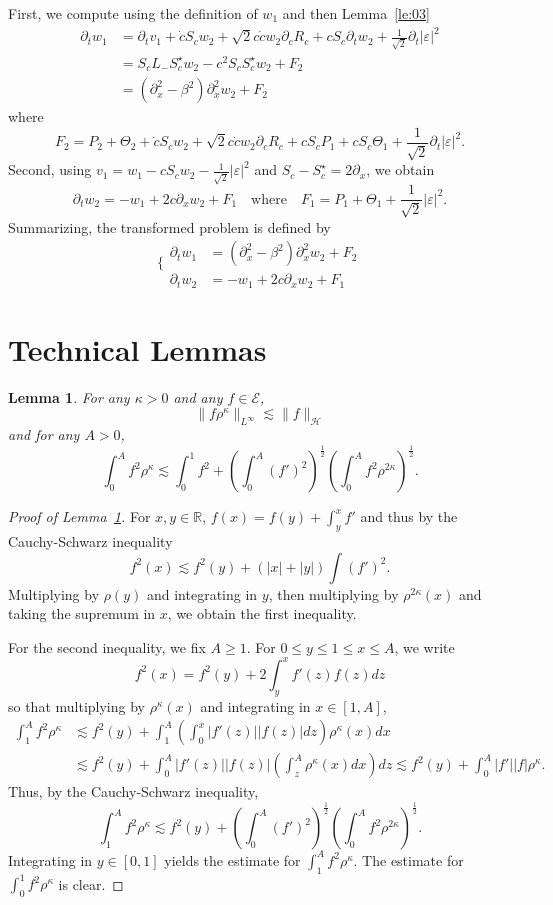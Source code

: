 \documentclass[11pt]{amsart}
\newtheorem{lemma}{Lemma}
\theoremstyle{remark}
\newcommand\RR{\mathbb{R}}
\newcommand\cE{\mathcal{E}}
\newcommand\cH{\mathcal{H}}
\newcommand\ep{\varepsilon}
\begin{document}
First, we compute using the definition of $w_1$ and then Lemma~\ref{le:03}
\begin{align*}
\partial_t w_1 &=\partial_t v_1+\dot c S_c w_2+\sqrt{2} c \dot c w_2\partial_c R_c +c S_c \partial_t w_2+\frac 1{\sqrt{2}} \partial_t |\ep|^2\\
&=S_cL_-S_c^\star w_2 - c^2 S_c S_c^\star w_2+F_2\\
&= (\partial_{x}^2-\beta^2 )\partial_{x}^2 w_2+F_2
\end{align*}
where 
\[
F_2=P_2+\Theta_2+\dot c S_c w_2+\sqrt{2} c\dot c w_2\partial_c R_c
+c S_c P_1+cS_c\Theta_1+\frac 1{\sqrt{2}} \partial_t |\ep|^2.
\]
Second, using $v_1=w_1-c S_c w_2-\frac 1{\sqrt{2}}|\ep|^2$ and $S_c-S_c^\star=2\partial_x$,
we obtain 
\[
\partial_t w_2=-w_1+2 c\partial_x w_2 + F_1\quad\mbox{where}\quad
F_1=P_1+\Theta_1+\frac 1{\sqrt{2}} |\ep|^2.
\]
Summarizing, the transformed problem is defined by
\[
\Bigg\{\begin{aligned}
\partial_t w_1&= (\partial_{x}^2-\beta^2 )\partial_{x}^2 w_2+F_2\\
\partial_t w_2& =-w_1+2 c\partial_x w_2 + F_1
\end{aligned}
\]

\section{Technical Lemmas}
\begin{lemma}\label{le:10}
For any $\kappa>0$ and any $f\in \cE$,
\[
\| f \rho^\kappa \|_{L^\infty} \lesssim \|f\|_\cH
\]
and for any $A>0$,
\[
\int_0^A f^2 \rho^\kappa \lesssim \int_0^1 f^2 + 
\left(\int_0^A (f')^2\right)^\frac 12 \left(\int_0^A f^2 \rho^{2\kappa}\right)^\frac 12.
\]
\end{lemma}
\begin{proof}[Proof of Lemma~\ref{le:10}]
For $x,y\in \RR$,
$
f(x)  = f(y) +  \int_y^x f'
$
and thus by the Cauchy-Schwarz inequality
\[
f^2(x) \lesssim f^2(y)   +  (|x|+|y|) \int (f')^2.
\]
Multiplying by $\rho(y)$ and integrating in $y$, then 
multiplying by $\rho^{2\kappa}(x)$ and taking the supremum in $x$, we obtain the
first inequality.

For the second inequality, we fix $A\geq 1$.
For $0\leq y\leq 1\leq x\leq A$, we write
\[
f^2(x) = f^2(y) + 2 \int_y^x f'(z)f(z) dz
\]
so that multiplying by $\rho^\kappa(x) $ and integrating in $x\in [1,A]$,
\begin{align*}
\int_1^A f^2 \rho^\kappa & \lesssim f^2(y) + \int_1^A \left(\int_0^x |f'(z)| |f(z)| dz \right) \rho^\kappa(x) dx\\
& \lesssim f^2(y) + \int_0^A |f'(z)| |f(z)| \left(\int_z^A \rho^\kappa(x) dx\right) dz 
\lesssim f^2(y) + \int_0^A |f'| |f| \rho^\kappa.
\end{align*}
Thus, by the Cauchy-Schwarz inequality,
\[
\int_1^A f^2 \rho^\kappa \lesssim f^2(y) 
+ \left(\int_0^A (f')^2\right)^\frac12 \left(\int_0^A f^2 \rho^{2\kappa}\right)^\frac 12.
\]
Integrating in $y\in [0,1]$ yields the estimate for $\int_1^A f^2 \rho^\kappa$.
The estimate for $\int_0^1 f^2 \rho^\kappa$ is clear.
\end{proof}
 
\end{document}
